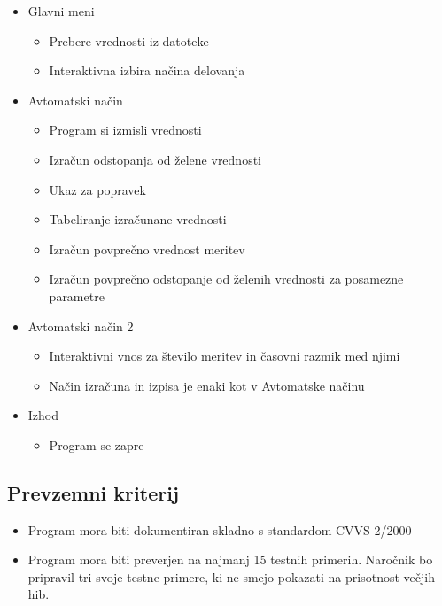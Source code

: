 \documentclass[a4paper,12pt]{article}
\begin{document}
			\begin{itemize}
				\item Glavni meni
						\begin{itemize}
							\item Prebere vrednosti iz datoteke
							\item Interaktivna izbira načina delovanja
						\end{itemize}
				\item Avtomatski način
						\begin{itemize}
							\item Program si izmisli vrednosti
							\item Izračun odstopanja od želene vrednosti
							\item Ukaz za popravek
							\item Tabeliranje izračunane vrednosti
							\item Izračun povprečno vrednost meritev
							\item Izračun povprečno odstopanje od želenih vrednosti za posamezne parametre
						\end{itemize}
				\item Avtomatski način 2
						\begin{itemize}
							\item Interaktivni vnos za število meritev in časovni razmik med njimi
							\item Način izračuna in izpisa je enaki kot v Avtomatske načinu
						\end{itemize}
				\item Izhod
						\begin{itemize}
							\item Program se zapre
						\end{itemize}
			\end{itemize}

		\subsection{Prevzemni kriterij}

			\begin{itemize}
				\item Program mora biti dokumentiran skladno s standardom CVVS-2/2000
				\item Program mora biti preverjen na najmanj 15 testnih primerih. 
				Naročnik bo pripravil tri svoje testne primere, ki ne smejo pokazati na prisotnost večjih hib.
			\end{itemize}
\end{document}

